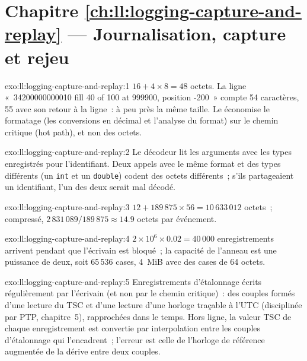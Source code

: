 \section*{Chapitre \ref{ch:ll:logging-capture-and-replay} --- Journalisation, capture et rejeu}

\begin{solution}{exo:ll:logging-capture-and-replay:1}
$16 + 4 \times 8 = 48$ octets. La ligne «~34200000000010 fill 40 of 100 at 999900, position -200~» compte 54 caractères, 55 avec son
retour à la ligne~: à peu près la même taille. Le  économise le formatage (les conversions en décimal et l'analyse du format) sur
le chemin critique (hot path), et non des octets.
\end{solution}

\begin{solution}{exo:ll:logging-capture-and-replay:2}
Le décodeur lit les arguments avec les types enregistrés pour l'identifiant. Deux appels avec le même format et des
types différents (un \texttt{int} et un \texttt{double}) codent des octets différents~; s'ils partageaient un identifiant, l'un des
deux serait mal décodé.
\end{solution}

\begin{solution}{exo:ll:logging-capture-and-replay:3}
$12 + 189\,875 \times 56 = 10\,633\,012$ octets~; compressé, $2\,831\,089 / 189\,875 \approx 14.9$ octets par événement.
\end{solution}

\begin{solution}{exo:ll:logging-capture-and-replay:4}
$2 \times 10^6 \times 0.02 = 40\,000$ enregistrements arrivent pendant que l'écrivain est bloqué~; la capacité de l'anneau est une
puissance de deux, soit 65\,536 cases, 4~MiB avec des cases de 64 octets.
\end{solution}

\begin{solution}{exo:ll:logging-capture-and-replay:5}
Enregistrements d'étalonnage écrits régulièrement par l'écrivain (et non par le chemin critique)~: des couples formés d'une lecture du TSC et
d'une lecture d'une horloge traçable à l'UTC (disciplinée par PTP, chapitre~5), rapprochées dans le temps. Hors ligne, la valeur TSC de chaque
enregistrement est convertie par interpolation entre les couples d'étalonnage qui l'encadrent~; l'erreur est celle de l'horloge de référence augmentée de la dérive entre deux couples.
\end{solution}

